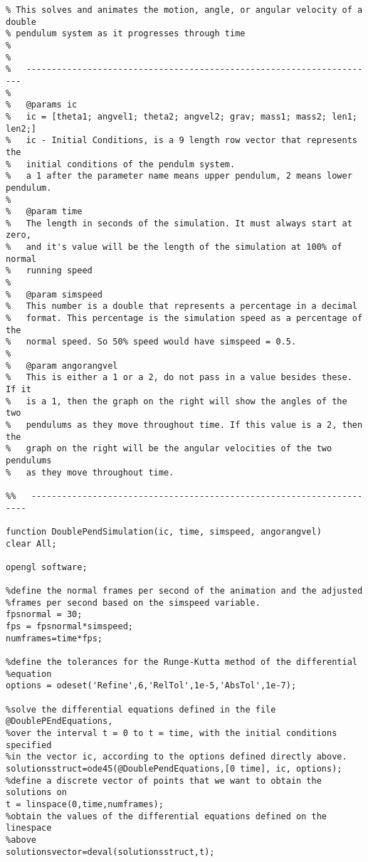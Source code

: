 \documentclass[11]{article}
\begin{document}
\begin{verbatim}
% This solves and animates the motion, angle, or angular velocity of a double 
% pendulum system as it progresses through time
%
%   
%   ---------------------------------------------------------------------
%   
%   @params ic
%   ic = [theta1; angvel1; theta2; angvel2; grav; mass1; mass2; len1; len2;]
%   ic - Initial Conditions, is a 9 length row vector that represents the
%   initial conditions of the pendulm system.
%   a 1 after the parameter name means upper pendulum, 2 means lower pendulum.
%
%   @param time
%   The length in seconds of the simulation. It must always start at zero,
%   and it's value will be the length of the simulation at 100% of normal
%   running speed
%
%   @param simspeed
%   This number is a double that represents a percentage in a decimal
%   format. This percentage is the simulation speed as a percentage of the
%   normal speed. So 50% speed would have simspeed = 0.5.
%
%   @param angorangvel
%   This is either a 1 or a 2, do not pass in a value besides these. If it
%   is a 1, then the graph on the right will show the angles of the two
%   pendulums as they move throughout time. If this value is a 2, then the
%   graph on the right will be the angular velocities of the two pendulums
%   as they move throughout time.

%%   ---------------------------------------------------------------------

function DoublePendSimulation(ic, time, simspeed, angorangvel)
clear All;

opengl software;

%define the normal frames per second of the animation and the adjusted
%frames per second based on the simspeed variable.
fpsnormal = 30;
fps = fpsnormal*simspeed; 
numframes=time*fps;

%define the tolerances for the Runge-Kutta method of the differential
%equation
options = odeset('Refine',6,'RelTol',1e-5,'AbsTol',1e-7); 

%solve the differential equations defined in the file @DoublePEndEquations,
%over the interval t = 0 to t = time, with the initial conditions specified
%in the vector ic, according to the options defined directly above.
solutionsstruct=ode45(@DoublePendEquations,[0 time], ic, options);
%define a discrete vector of points that we want to obtain the solutions on
t = linspace(0,time,numframes);
%obtain the values of the differential equations defined on the linespace
%above
solutionsvector=deval(solutionsstruct,t);


\end{verbatim}
\end{document}
